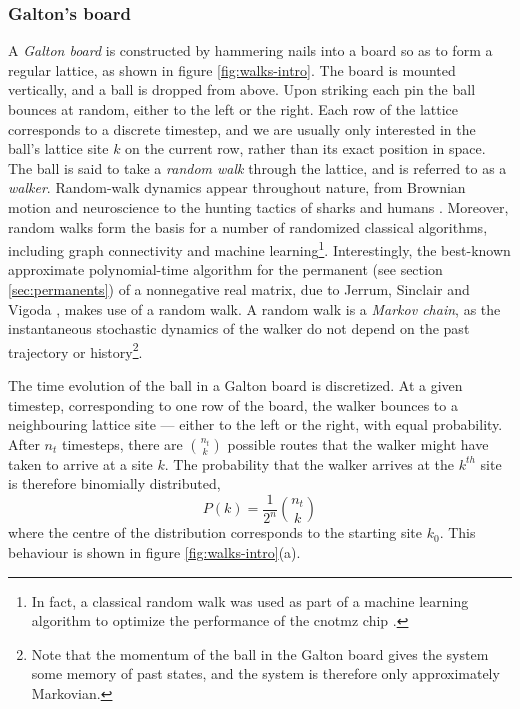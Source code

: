 \subsubsection{Galton's board}
\label{sec:galtons-board}
A \emph{Galton board} is constructed by hammering nails into a board so as to form a regular lattice, as shown in figure \ref{fig:walks-intro}. The board is mounted vertically, and a ball is dropped from above. Upon striking each pin the ball bounces at random, either to the left or the right. 
Each row of the lattice corresponds to a discrete timestep, and we are usually only interested in the ball's lattice site $k$ on the current row, rather than its exact position in space. 
The ball is said to take a \emph{random walk} through the lattice, and is referred to as a \emph{walker}. Random-walk dynamics appear throughout nature, from Brownian motion and neuroscience to the hunting tactics of sharks \cite{Viswanathan1999} and humans \cite{Raichlen2013}. Moreover, random walks form the basis for a number of randomized classical algorithms, including graph connectivity \cite{Motwani1995a} and machine learning\footnote{In fact, a classical random walk was used as part of a machine learning algorithm to optimize the performance of the \acrshort{cnotmz} chip \cite{Li2013}.}.  Interestingly, the best-known approximate polynomial-time algorithm for the permanent (see section \ref{sec:permanents}) of a nonnegative real matrix, due to Jerrum, Sinclair and Vigoda \cite{Jerrum2004a}, makes use of a random walk.
 A random walk is a \emph{Markov chain}, as the instantaneous stochastic dynamics of the walker do not depend on the past trajectory or history\footnote{Note that the momentum of the ball in the Galton board gives the system some memory of past states, and the system is therefore only approximately Markovian.}.

The time evolution of the ball in a Galton board is discretized. At a given timestep, corresponding to one row of the board, the walker bounces to a neighbouring lattice site --- either to the left or the right, with equal probability. After $n_t$ timesteps, there are $\binom{n_t}{k}$ possible routes that the walker might have taken to arrive at a site $k$. The probability that the walker arrives at the $k^{th}$ site is therefore binomially distributed, 
\begin{equation}
   P(k) = \frac{1}{2^n} \binom{n_t}{k} 
\end{equation}
where the centre of the distribution corresponds to the starting site $k_0$. This behaviour is shown in figure \ref{fig:walks-intro}(a).

